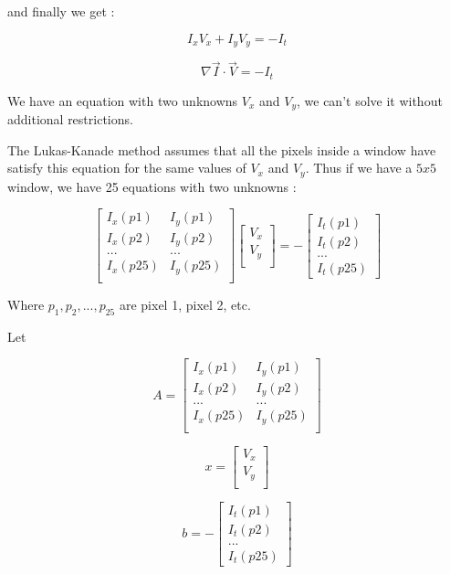 and finally we get :

$$ I_x V_x + I_y V_y = -I_t $$

\begin{equation}
\label{eq:oflowgeneral}
\nabla{\vec{I}} \cdot \vec{V} = -I_t
\end{equation}

We have an equation with two unknowns $V_x$ and $V_y$, we can't solve it without additional restrictions.

The Lukas-Kanade method assumes that all the pixels inside a window have satisfy this equation for the same 
values of $V_x$ and $V_y$. Thus if we have a $5x5$ window, we have 25 equations with two unknowns :

$$
\begin{bmatrix}
I_x(p1) & I_y(p1) \\
I_x(p2) & I_y(p2) \\
... & ... \\
I_x(p25) & I_y(p25)\\
\end{bmatrix}  
\begin{bmatrix}
V_x \\
V_y\\
\end{bmatrix}
=
-\begin{bmatrix}
I_t(p1) \\
I_t(p2) \\
...     \\
I_t(p25) 
\end{bmatrix}
$$

Where $p_1, p_2, ..., p_25$ are pixel 1, pixel 2, etc.

Let 

$$
A = 
\begin{bmatrix}
I_x(p1) & I_y(p1) \\
I_x(p2) & I_y(p2) \\
... & ... \\
I_x(p25) & I_y(p25)\\
\end{bmatrix}  
$$

$$
x=
\begin{bmatrix}
V_x \\
V_y\\
\end{bmatrix}
$$

$$
b=
-\begin{bmatrix}
I_t(p1) \\
I_t(p2) \\
...     \\
I_t(p25) 
\end{bmatrix}
$$

